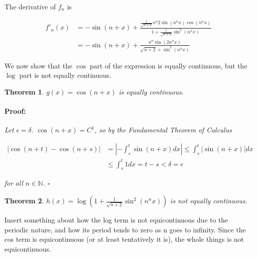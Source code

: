 \documentclass{article}
\newenvironment{proof}{\paragraph{Proof:}}{\hfill$\square$}
\newtheorem{theorem}{Theorem}
\newcommand{\N}{\mathbb{N}}
\begin{document}
The derivative of $f_n$ is

\begin{align*}
f'_n(x) &= -\sin(n+x) +
\frac{
\frac{1}{\sqrt{n+2}}n^n 2 \sin(n^n x) \cos(n^n x)
}{
1 + \frac{1}{\sqrt{n+2}} \sin^2(n^n x)
} \\
&= -\sin(n+x) +
\frac{
n^n \sin(2n^n x)
}{
\sqrt{n+2} + \sin^2(n^n x)
}
\end{align*}

We now show that the $\cos$ part of the expression is equally continuous, but the $\log$ part is not equally continuous.

\begin{theorem}
$g(x) = \cos(n+x)$ is equally continuous.
\begin{proof}
Let $\epsilon = \delta$. $\cos(n+x) = C^1$, so by the Fundamental Theorem of Calculus

\begin{align*}
|\cos(n+t) - \cos(n+s)| &= |- \int_s^t \sin(n+x)dx| \leq \int_s^t |\sin(n+x)|dx \\
&\leq \int_s^t 1 dx = t-s < \delta = \epsilon
\end{align*}

for all $n \in \N$.
\end{proof}
\end{theorem}

\begin{theorem}
$h(x) = \log(1 + \frac{1}{\sqrt{n+2}} \sin^2(n^n x))$ is not equally continuous.
\end{theorem}

Insert something about how the log term is not equicontinuous due to the periodic nature, and how its period tends to zero as n goes to infinity. Since the cos term is equicontinuous (or at least tentatively it is), the whole things is not equicontinuous.
\end{document}
